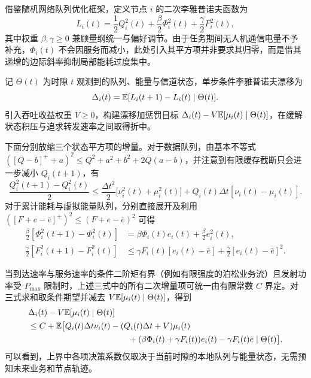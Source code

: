 借鉴随机网络队列优化框架\cite{algo1,algo2,intro13}，定义节点 $i$ 的二次李雅普诺夫函数为
\begin{equation}
 L_i(t)=\frac{1}{2}Q_i^2(t)+\frac{\beta}{2}\Phi_i^2(t)
                 +\frac{\gamma}{2}F_i^2(t),
 \label{rq1:eq:lyapunov}
\end{equation}
其中权重 $\beta,\gamma\ge0$ 兼顾量纲统一与偏好调节。由于任务期间无人机通信电量不予补充，$\Phi_i(t)$ 不会因服务而减小，此处引入其平方项并非要求其归零，而是借其递增的边际斜率抑制局部能耗过度集中。

记 $\Theta(t)$ 为时隙 $t$ 观测到的队列、能量与信道状态，单步条件李雅普诺夫漂移为
\begin{equation}
 \Delta_i(t)=\mathbb{E}[L_i(t+1)-L_i(t)\mid\Theta(t)].
 \label{rq1:eq:drift}
\end{equation}
引入吞吐收益权重 $V\ge0$，构建漂移加惩罚目标 $\Delta_i(t)-V\mathbb{E}[\mu_i(t)\mid\Theta(t)]$，在缓解状态积压与追求转发速率之间取得折中。

下面分别放缩三个状态平方项的增量。对于数据队列，由基本不等式 $([Q-b]^++a)^2\le Q^2+a^2+b^2+2Q(a-b)$，并注意到有限缓存截断只会进一步减小 $Q_i(t+1)$，有
\begin{equation}
 \frac{Q_i^2(t+1)-Q_i^2(t)}{2}
 \le\frac{\Delta t^2}{2}\bigl[\nu_i^2(t)+\mu_i^2(t)\bigr]
       +Q_i(t)\Delta t[\nu_i(t)-\mu_i(t)].
 \label{rq1:eq:queue_drift}
\end{equation}
对于累计能耗与虚拟能量队列，分别直接展开及利用 $([F+e-\bar e]^+)^2\le(F+e-\bar e)^2$ 可得
\begin{align}
 \frac{\beta}{2}[\Phi_i^2(t+1)-\Phi_i^2(t)]
 &=\beta\Phi_i(t)e_i(t)+\frac{\beta}{2}e_i^2(t),
 \label{rq1:eq:energy_drift}\\
 \frac{\gamma}{2}[F_i^2(t+1)-F_i^2(t)]
 &\le\gamma F_i(t)[e_i(t)-\bar e]
       +\frac{\gamma}{2}[e_i(t)-\bar e]^2.
 \label{rq1:eq:virtual_drift}
\end{align}

当到达速率与服务速率的条件二阶矩有界（例如有限强度的泊松业务流）且发射功率受 $P_{\max}$ 限制时，上述三式中的所有二次增量项可统一由有限常数 $C$ 界定。对三式求和取条件期望并减去 $V\mathbb{E}[\mu_i(t)\mid\Theta(t)]$，得到
\begin{align}
 &\Delta_i(t)-V\E[\mu_i(t)\mid\Theta(t)]\nonumber\\
 &\quad\le C+\E\bigl[Q_i(t)\Delta t\nu_i(t)
       -(Q_i(t)\Delta t+V)\mu_i(t)\nonumber\\
 &\hspace{42mm}
       +(\beta\Phi_i(t)+\gamma F_i(t))e_i(t)
       -\gamma F_i(t)\bar e\mid\Theta(t)\bigr].
 \label{rq1:eq:dpp_bound}
\end{align}
可以看到，上界中各项决策系数仅取决于当前时隙的本地队列与能量状态，无需预知未来业务和节点轨迹。

